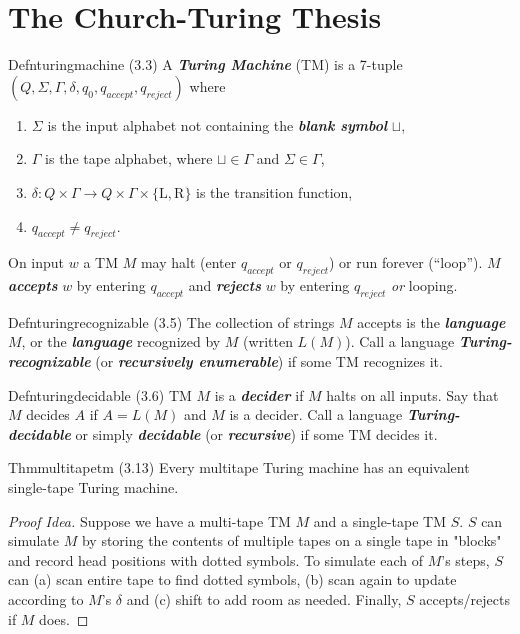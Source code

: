 \chapter{The Church-Turing Thesis}

\begin{reference}{Defn}{turingmachine}
  (3.3) A \textbf{\textit{Turing Machine}} (TM) is a 7-tuple $(Q,\Sigma,\Gamma,\delta,q_0,q_{accept},q_{reject})$ where
  \begin{enumerate}
    \item $\Sigma$ is the input alphabet not containing the \textbf{\textit{blank symbol}} $\sqcup$,
    \item $\Gamma$ is the tape alphabet, where $\sqcup\in \Gamma$ and $\Sigma\in \Gamma$,
    \item $\delta: Q\times \Gamma\to Q\times \Gamma\times\{\mathrm{L,R}\}$ is the transition function,
    \item $q_{accept}\neq q_{reject}$.
  \end{enumerate}
  On input $w$ a TM $M$ may halt (enter $q_{accept}$ or $q_{reject}$) or run forever (``loop''). $M$ \textbf{\textit{accepts}} $w$ by entering $q_{accept}$ and \textbf{\textit{rejects}} $w$ by entering $q_{reject}$ \textit{or} looping.
\end{reference}

\begin{reference}{Defn}{turingrecognizable}
  (3.5) The collection of strings $M$ accepts is the \textbf{\textit{language}} $M$, or the \textbf{\textit{language}} recognized by $M$ (written $L(M)$). Call a language \textbf{\textit{Turing-recognizable}} (or \textbf{\textit{recursively enumerable}}) if some TM recognizes it.
\end{reference}

\begin{reference}{Defn}{turingdecidable}
  (3.6) TM $M$ is a \textbf{\textit{decider}} if $M$ halts on all inputs. Say that $M$ decides $A$ if $A=L(M)$ and $M$ is a decider. Call a language \textbf{\textit{Turing-decidable}} or simply \textbf{\textit{decidable}} (or \textbf{\textit{recursive}}) if some TM decides it.
\end{reference}

\begin{reference}{Thm}{multitapetm}
  (3.13) Every multitape Turing machine has an equivalent single-tape Turing machine.
\end{reference}

\begin{proof}[Proof Idea]
  Suppose we have a multi-tape TM $M$ and a single-tape TM $S$. $S$ can simulate $M$ by storing the contents of multiple tapes on a single tape in "blocks" and record head positions with dotted symbols. To simulate each of $M$'s steps, $S$ can (a) scan entire tape to find dotted symbols, (b) scan again to update according to $M$'s $\delta$ and (c) shift to add room as needed. Finally, $S$ accepts/rejects if $M$ does.
\end{proof}


